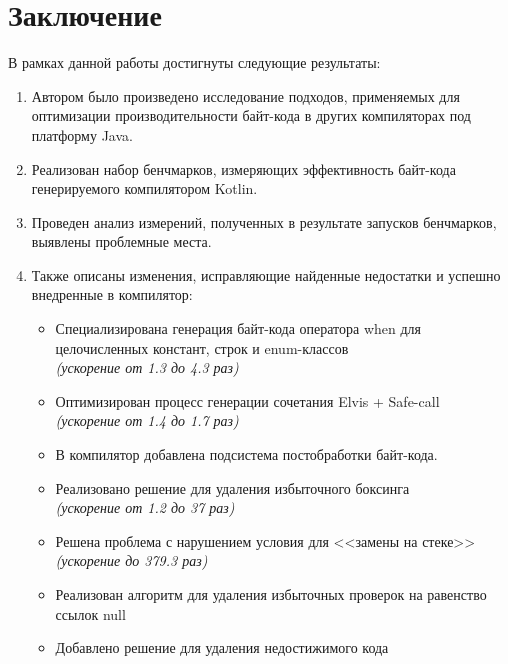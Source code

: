 \clearpage
\section*{Заключение}

В рамках данной работы достигнуты следующие результаты:

\begin{enumerate}
    \item Автором было произведено исследование подходов, применяемых для оптимизации
    производительности байт-кода в других компиляторах под платформу Java.

    \item Реализован набор бенчмарков, измеряющих эффективность байт-кода генерируемого
    компилятором Kotlin.

    \item Проведен анализ измерений, полученных в результате запусков бенчмарков, выявлены
    проблемные места.

    \item Также описаны изменения, исправляющие найденные недостатки и успешно внедренные в компилятор:
    \begin{itemize}
        \item Специализирована генерация байт-кода оператора when для целочисленных констант, строк и enum-классов \\
        \textit{(ускорение от 1.3 до 4.3 раз)}

        \item Оптимизирован процесс генерации сочетания Elvis + Safe-call \\
        \textit{(ускорение от 1.4 до 1.7 раз)}

        \item В компилятор добавлена подсистема постобработки байт-кода.
        \item Реализовано решение для удаления избыточного боксинга \\
        \textit{(ускорение от 1.2 до 37 раз)}
        \item Решена проблема с нарушением условия для <<замены на стеке>> \\
        \textit{(ускорение до 379.3 раз)}
        \item Реализован алгоритм для удаления избыточных проверок на равенство ссылок null
        \item Добавлено решение для удаления недостижимого кода
    \end{itemize}
\end{enumerate}
